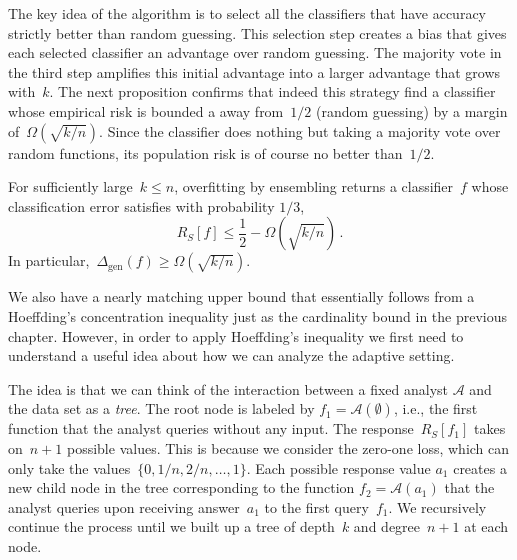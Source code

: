 \documentclass{tufte-book}
\begin{document}
The key idea of the algorithm is to select all the classifiers that have
accuracy strictly better than random guessing. This selection step
creates a bias that gives each selected classifier an advantage over
random guessing. The majority vote in the third step amplifies this
initial advantage into a larger advantage that grows with~\(k\). The
next proposition confirms that indeed this strategy find a classifier
whose empirical risk is bounded a away from~\(1/2\) (random guessing) by
a margin of~\(\Omega(\sqrt{k/n}).\) Since the classifier does nothing
but taking a majority vote over random functions, its population risk is
of course no better than~\(1/2\).

\begin{Proposition}

For sufficiently large~\(k\le n\), overfitting by ensembling returns a
classifier~\(f\) whose classification error satisfies with probability
\(1/3\), \[
R_S[f]\le \frac12-\Omega(\sqrt{k/n})\,.
\] In particular,~\(\Delta_{\mathrm{gen}}(f)\ge\Omega(\sqrt{k/n})\).

\end{Proposition}

We also have a nearly matching upper bound that essentially follows from
a Hoeffding's concentration inequality just as the cardinality bound in
the previous chapter. However, in order to apply Hoeffding's inequality
we first need to understand a useful idea about how we can analyze the
adaptive setting.

The idea is that we can think of the interaction between a fixed analyst
\(\mathcal{A}\) and the data set as a \emph{tree}. The root node is
labeled by \(f_1=\mathcal{A}(\emptyset)\), i.e., the first function that
the analyst queries without any input. The response~\(R_S[f_1]\) takes
on~\(n+1\) possible values. This is because we consider the zero-one
loss, which can only take the values~\(\{0, 1/n, 2/n,\dots, 1\}\). Each
possible response value \(a_1\) creates a new child node in the tree
corresponding to the function \(f_2=\mathcal{A}(a_1)\) that the analyst
queries upon receiving answer~\(a_1\) to the first query~\(f_1\). We
recursively continue the process until we built up a tree of depth~\(k\)
and degree~\(n+1\) at each node.
\end{document}
